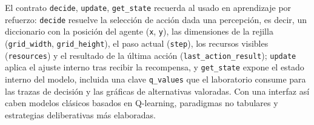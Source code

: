 El contrato \texttt{decide}, \texttt{update}, \texttt{get\_state}
recuerda al usado en aprendizaje por refuerzo:
\texttt{decide} resuelve la selección de acción dada una percepción, es
decir, un diccionario con la posición del agente (\texttt{x}, \texttt{y}), las
dimensiones de la rejilla (\texttt{grid\_width}, \texttt{grid\_height}),
el paso actual (\texttt{step}), los recursos visibles (\texttt{resources})
y el resultado de la última acción (\texttt{last\_action\_result});
\texttt{update} aplica el ajuste interno tras recibir la recompensa, y
\texttt{get\_state} expone el estado interno del modelo, incluida una
clave \texttt{q\_values} que el laboratorio consume para las trazas de
decisión y las gráficas de alternativas valoradas. Con una interfaz así caben
modelos clásicos basados en Q-learning, paradigmas no tabulares y estrategias
deliberativas más elaboradas.

